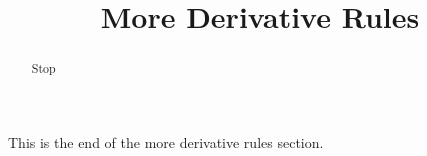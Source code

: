 \documentclass[handout]{ximera}
\title{More Derivative Rules}
\begin{document}
\begin{abstract} Stop
\end{abstract}

\maketitle

This is the end of the more derivative rules section.
\end{document}
